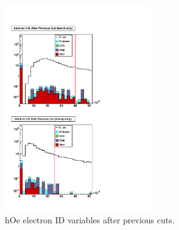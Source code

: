  \begin{figure}[htb]
  \begin{center}


    \includegraphics[width=180pt, angle=90]{Figures/hOeSeq-01Apr11.pdf}
  \end{center}
  \caption[hOe electron ID variables after previous cuts]{hOe electron ID variables after previous cuts.}
  \label{fig:hOeElecIdVars}
 \end{figure}



